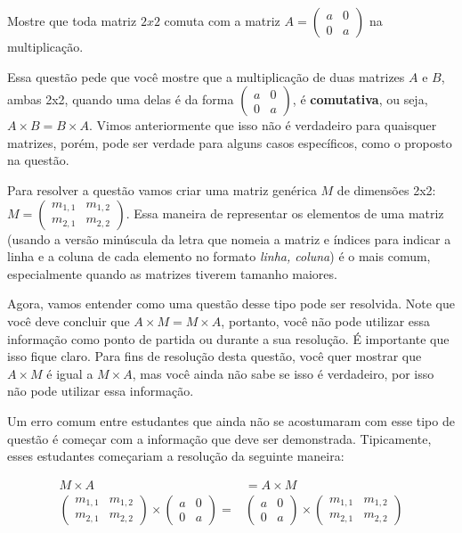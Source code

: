 \documentclass[main_estudante.tex]{subfiles}
\begin{document}
\begin{resolvida}
Mostre que toda matriz $2x2$ comuta com a matriz $A=\begin{pmatrix}a & 0 \\ 0 & a\end{pmatrix}$ na multiplicação.
\end{resolvida}


Essa questão pede que você mostre que a multiplicação de duas matrizes $A$ e $B$, ambas 2x2, quando uma delas é da forma $\begin{pmatrix}a & 0 \\ 0 & a\end{pmatrix}$, é \textbf{comutativa}, ou seja, $A \times B = B \times A$. Vimos anteriormente que isso não é verdadeiro para quaisquer matrizes, porém, pode ser verdade para alguns casos específicos, como o proposto na questão.

Para resolver a questão vamos criar uma matriz genérica $M$ de dimensões 2x2: $M = \begin{pmatrix}m_{1,1} & m_{1,2} \\ m_{2,1} & m_{2,2}\end{pmatrix}$. Essa maneira de representar os elementos de uma matriz (usando a versão minúscula da letra que nomeia a matriz e índices para indicar a linha e a coluna de cada elemento no formato {\it linha, coluna}) é o mais comum, especialmente quando as matrizes tiverem tamanho maiores.

Agora, vamos entender como uma questão desse tipo pode ser resolvida. Note que você deve concluir que $A \times M = M \times A$, portanto, você não pode utilizar essa informação como ponto de partida ou durante a sua resolução. É importante que isso fique claro. Para fins de resolução desta questão, você quer mostrar que $A \times M$ é igual a $M \times A$, mas você ainda não sabe se isso é verdadeiro, por isso não pode utilizar essa informação.

Um erro comum entre estudantes que ainda não se acostumaram com esse tipo de questão é começar com a informação que deve ser demonstrada. Tipicamente, esses estudantes começariam a resolução da seguinte maneira:

\begin{equation*}\begin{align}
M \times A & = A \times M  \\
\begin{pmatrix}m_{1,1} & m_{1,2} \\ m_{2,1} & m_{2,2}\end{pmatrix} \times \begin{pmatrix}a & 0 \\ 0 & a\end{pmatrix} = {} & \begin{pmatrix}a & 0 \\ 0 & a\end{pmatrix} \times \begin{pmatrix}m_{1,1} & m_{1,2} \\ m_{2,1} & m_{2,2}\end{pmatrix}
\end{align}\end{equation*}
\end{document}
